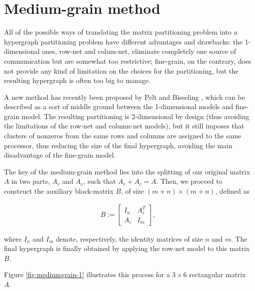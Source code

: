 \section{Medium-grain method} \label{sec:mediumgrain}

All of the possible ways of translating the matrix partitioning problem into a hypergraph partitioning problem have different advantages and drawbacks: the 1-dimensional ones, row-net and colum-net, eliminate completely one source of communication but are somewhat too restrictive; fine-grain, on the contrary, does not provide any kind of limitation on the choices for the partitioning, but the resulting hypergraph is often too big to manage.

A new method has recently been proposed by Pelt and Bisseling \cite{mediumgrain}, which can be described as a sort of middle ground between the 1-dimensional models and fine-grain model. The resulting partitioning is 2-dimensional by design (thus avoiding the limitations of the row-net and column-net models), but it still imposes that clusters of nonzeros from the same rows and columns are assigned to the same processor, thus reducing the size of the final hypergraph, avoiding the main disadvantage of the fine-grain model.

The key of the medium-grain method lies into the splitting of our original matrix $A$ in two parts, $A_r$ and $A_c$, such that $A_r + A_c = A$. Then, we proceed to construct the auxiliary block-matrix $B$, of size $(m+n) \times (m+n)$, defined as

\begin{align}
	B:=	\begin{bmatrix}
		I_n & A_r^T \\
		A_c & I_m
	\end{bmatrix},
	\label{eq:Bmatrix}
\end{align}

where $I_n$ and $I_m$ denote, respectively, the identity matrices of size $n$ and $m$. The final hypergraph is finally obtained by applying the row-net model to this matrix $B$. 

Figure \ref{fig:mediumgrain-1} illustrates this process for a $3 \times 6$ rectangular matrix $A$.

